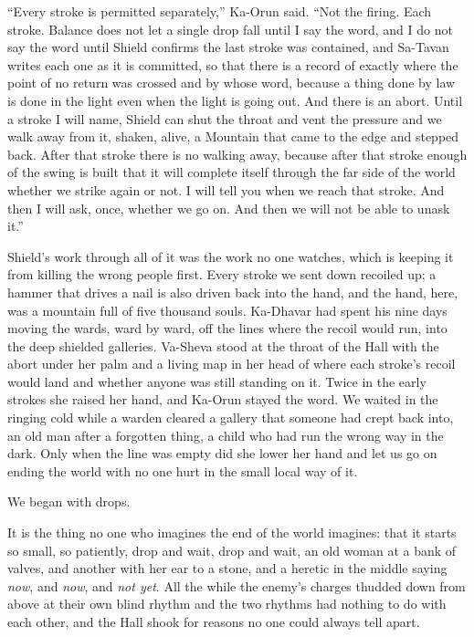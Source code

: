``Every stroke is permitted separately,'' Ka-Orun said. ``Not the firing. Each stroke. Balance does not let a single drop fall until I say the word, and I do not say the word until Shield confirms the last stroke was contained, and Sa-Tavan writes each one as it is committed, so that there is a record of exactly where the point of no return was crossed and by whose word, because a thing done by law is done in the light even when the light is going out. And there is an abort. Until a stroke I will name, Shield can shut the throat and vent the pressure and we walk away from it, shaken, alive, a Mountain that came to the edge and stepped back. After that stroke there is no walking away, because after that stroke enough of the swing is built that it will complete itself through the far side of the world whether we strike again or not. I will tell you when we reach that stroke. And then I will ask, once, whether we go on. And then we will not be able to unask it.''\par

Shield's work through all of it was the work no one watches, which is keeping it from killing the wrong people first. Every stroke we sent down recoiled up; a hammer that drives a nail is also driven back into the hand, and the hand, here, was a mountain full of five thousand souls. Ka-Dhavar had spent his nine days moving the wards, ward by ward, off the lines where the recoil would run, into the deep shielded galleries. Va-Sheva stood at the throat of the Hall with the abort under her palm and a living map in her head of where each stroke's recoil would land and whether anyone was still standing on it. Twice in the early strokes she raised her hand, and Ka-Orun stayed the word. We waited in the ringing cold while a warden cleared a gallery that someone had crept back into, an old man after a forgotten thing, a child who had run the wrong way in the dark. Only when the line was empty did she lower her hand and let us go on ending the world with no one hurt in the small local way of it.\par

\ornament

We began with drops.\par

It is the thing no one who imagines the end of the world imagines: that it starts so small, so patiently, drop and wait, drop and wait, an old woman at a bank of valves, and another with her ear to a stone, and a heretic in the middle saying \emph{now}, and \emph{now}, and \emph{not yet}. All the while the enemy's charges thudded down from above at their own blind rhythm and the two rhythms had nothing to do with each other, and the Hall shook for reasons no one could always tell apart.\par

